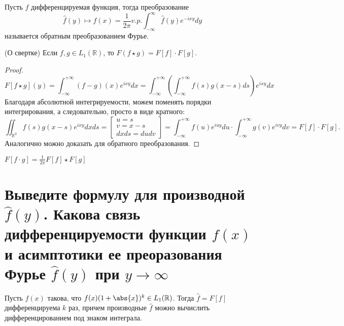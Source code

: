 \begin{definition}
    Пусть $f$ дифференцируемая функция, тогда преобразование
        $$\hat{f}(y) \mapsto f(x) = \frac{1}{2\pi} v.p.\int_{-\infty}^{\infty}\hat{f}(y)e^{-ixy}dy$$
    называется обратным преобразованием Фурье.
\end{definition}

\begin{theorem} (О свертке)
    Если $f, g\in L_1(\mathbb{R})$, то $F(f\star g) = F[f]\cdot F[g]$.
\end{theorem}
\begin{proof}
    $$
    F[f\star g](y) = \int_{-\infty}^{+\infty}(f - g)(x)e^{ixy}dx = \int_{-\infty}^{+\infty}\left(\int_{-\infty}^{+\infty}f(s)g(x - s)ds\right)e^{ixy}dx
    $$
    Благодаря абсолютной интегрируемости, можем поменять порядки интегрирования, а следовательно, просто в виде кратного:
    $$
    \iint_{\mathbb{R}^2} f(s)g(x - s)e^{ixy}dxds
    =
    \begin{bmatrix}
        u = s \\
        v = x - s \\
        dxds = dudv
    \end{bmatrix}
    =
    \int_{-\infty}^{+\infty} f(u)e^{iuy}du\cdot \int_{-\infty}^{+\infty} g(v)e^{ivy}dv = F[f] \cdot F[g].
    $$
    Аналогично можно доказать для обратного преобразования.
\end{proof}

\begin{corollary}
    $F[f\cdot g] = \frac{1}{2\pi}F[f]\star F[g]$
\end{corollary}

\section{Выведите формулу для производной $\hat{f}(y)$. Какова связь дифференцируемости функции $f(x)$ и асимптотики ее преоразования Фурье $\hat{f}(y)$ при $y\to\infty$}

\begin{statement}
    Пусть $f(x)$ такова, что $f(x)(1 + \abs{x})^k\in L_1(\mathbb{R})$. Тогда $\hat{f} = F[f]$ дифференцируема $k$ раз, причем производные $\hat{f}$ можно вычислить дифференцированием под знаком интеграла.
\end{statement}

